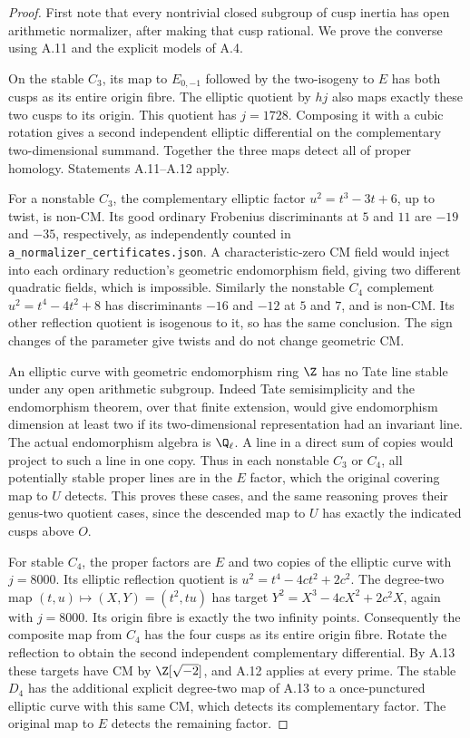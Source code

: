 \begin{proof}
First note that every nontrivial closed subgroup of cusp inertia
has open arithmetic normalizer, after making that cusp rational.
We prove the converse using A.11 and the explicit models of A.4.

On the stable $C_3$, its map to $E_{0,-1}$ followed by the
two-isogeny to $E$ has both cusps as its entire origin fibre.
The elliptic quotient by $hj$ also maps exactly these two cusps
to its origin. This quotient has $j=1728$. Composing it with a
cubic rotation gives a second independent elliptic differential
on the complementary two-dimensional summand. Together the three
maps detect all of proper homology. Statements A.11--A.12 apply.

For a nonstable $C_3$, the complementary elliptic factor
$u^2=t^3-3t+6$, up to twist, is non-CM. Its good ordinary
Frobenius discriminants at $5$ and $11$ are $-19$ and $-35$,
respectively, as independently counted in
\texttt{a\_normalizer\_certificates.json}.
A characteristic-zero CM field would inject into each ordinary
reduction's geometric endomorphism field, giving two different
quadratic fields, which is impossible. Similarly the nonstable
$C_4$ complement $u^2=t^4-4t^2+8$ has discriminants $-16$ and
$-12$ at $5$ and $7$, and is non-CM. Its other reflection quotient
is isogenous to it, so has the same conclusion. The sign changes
of the parameter give twists and do not change geometric CM.

An elliptic curve with geometric endomorphism ring $\Z$ has no
Tate line stable under any open arithmetic subgroup. Indeed Tate
semisimplicity and the endomorphism theorem, over that finite
extension, would give endomorphism dimension at least two if its
two-dimensional representation had an invariant line. The actual
endomorphism algebra is $\Q_\ell$. A line in a direct sum of
copies would project to such a line in one copy. Thus in each
nonstable $C_3$ or $C_4$, all potentially stable proper lines are
in the $E$ factor, which the original covering map to $U$ detects.
This proves these cases, and the same reasoning proves their
genus-two quotient cases, since the descended map to $U$ has
exactly the indicated cusps above $O$.

For stable $C_4$, the proper factors are $E$ and two copies of
the elliptic curve with $j=8000$. Its elliptic reflection quotient
is $u^2=t^4-4ct^2+2c^2$. The degree-two map
$(t,u)\mapsto(X,Y)=(t^2,tu)$ has target
$Y^2=X^3-4cX^2+2c^2X$, again with $j=8000$.
Its origin fibre is exactly the two infinity points.
Consequently the composite map from $C_4$ has the four cusps as
its entire origin fibre. Rotate the reflection to obtain the
second independent complementary differential. By A.13 these
targets have CM by $\Z[\sqrt{-2}]$, and A.12 applies at every
prime. The stable $D_4$ has the additional explicit degree-two
map of A.13 to a once-punctured elliptic curve with this same CM,
which detects its complementary factor. The original map to $E$
detects the remaining factor.


\end{proof}

